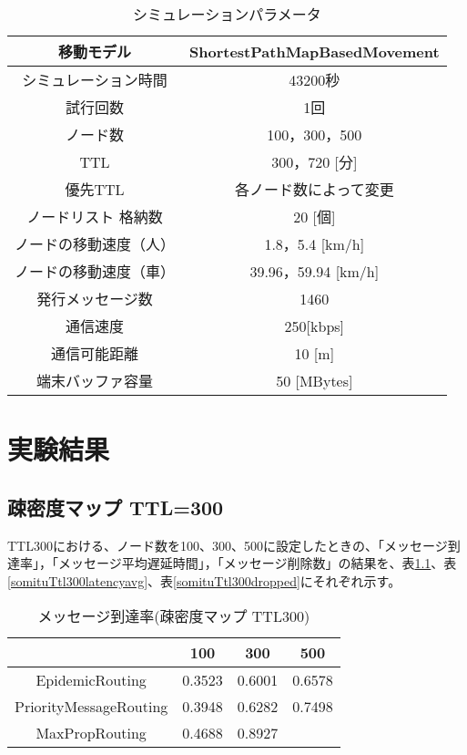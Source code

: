 \documentclass[11pt]{icsthesis}
\begin{document}
\begin{table}[h]
    \begin{center}
      \caption[]{シミュレーションパラメータ}
      \label{example:terminology}
      \begin{tabular}{|c|c|}
        \hline
        移動モデル & ShortestPathMapBasedMovement\\
        \hline
        シミュレーション時間 & 43200秒\\
        \hline
        試行回数 & 1回\\
        \hline
        ノード数 & 100，300，500\\
        \hline
        TTL & 300，720 [分]\\
        \hline
        優先TTL & 各ノード数によって変更\\
        \hline
        ノードリスト
        格納数 & 20 [個]\\
        \hline
        ノードの移動速度（人） & 1.8，5.4 [km/h]\\
        \hline
        ノードの移動速度（車） & 39.96，59.94 [km/h]\\
        \hline
        発行メッセージ数 & 1460\\
        \hline
        通信速度 & 250[kbps]\\
        \hline
        通信可能距離 & 10 [m]\\
        \hline
        端末バッファ容量 & 50 [MBytes]\\
        \hline
      \end{tabular}
    \end{center}
\end{table}
\chapter{実験結果}

\section{疎密度マップ TTL=300}
TTL300における、ノード数を100、300、500に設定したときの、「メッセージ到達率」，「メッセージ平均遅延時間」，「メッセージ削除数」の結果を、表\ref{somituTtl300deliveryprob}、表\ref{somituTtl300latencyavg}、表\ref{somituTtl300dropped}にそれぞれ示す。
\begin{table}[H]
 \begin{center}
      \caption[]{メッセージ到達率(疎密度マップ TTL300)}
      \label{somituTtl300deliveryprob}
      \begin{tabular}{|c|c|c|c|}
\hline
&100&300&500\\
\hline
EpidemicRouting&0.3523&0.6001&0.6578\\
\hline
PriorityMessageRouting&0.3948&0.6282&0.7498\\
\hline
MaxPropRouting&0.4688&0.8927&\\
\hline
      \end{tabular}
    \end{center}
\end{table}
\end{document}
